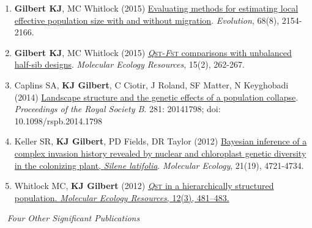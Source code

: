 \begin{enumerate}[nolistsep]
\item \textbf{Gilbert KJ}, MC Whitlock (2015) \href{http://onlinelibrary.wiley.com/doi/10.1111/evo.12713/abstract}{Evaluating methods for estimating local effective population size with and without migration}. \emph{Evolution}, 68(8), 2154-2166.


\item \textbf{Gilbert KJ}, MC Whitlock (2015) \href{http://onlinelibrary.wiley.com/doi/10.1111/1755-0998.12303/abstract}{\emph{Q}\footnotesize{\textsc{st}}-\normalsize \emph{F}\footnotesize{\textsc{st}} \normalsize comparisons with unbalanced half-sib designs}. \emph{Molecular Ecology Resources}, 15(2), 262-267.

\item Caplins SA, \textbf{KJ Gilbert}, C Ciotir, J Roland, SF Matter, N Keyghobadi (2014) \href{http://m.rspb.royalsocietypublishing.org/content/281/1796/20141798.abstract?cpetoc}{Landscape structure and the genetic effects of a population collapse}. \emph{Proceedings of the Royal Society B}. 281: 20141798; doi: 10.1098/rspb.2014.1798 
   
\item Keller SR, \textbf{KJ Gilbert}, PD Fields, DR Taylor (2012) \href {http://onlinelibrary.wiley.com/doi/10.1111/j.1365-294X.2012.05751.x/abstract}{Bayesian inference of a complex invasion history revealed by nuclear and chloroplast genetic diversity in the colonizing plant, \emph{Silene latifolia}}. \emph{Molecular Ecology}, 21(19), 4721-4734.

\item Whitlock MC, \textbf{KJ Gilbert} (2012) \href {http://onlinelibrary.wiley.com/doi/10.1111/j.1755-0998.2012.03122.x/abstract}{ \emph{Q}\footnotesize{\textsc{st}} \normalsize{in a hierarchically structured population}. \emph{Molecular Ecology Resources}, 12(3), 481--483.} 
    
\end{enumerate}

\vspace{2pt}
\noindent
~ \emph{Four Other Significant Publications}
\vspace{2pt}

